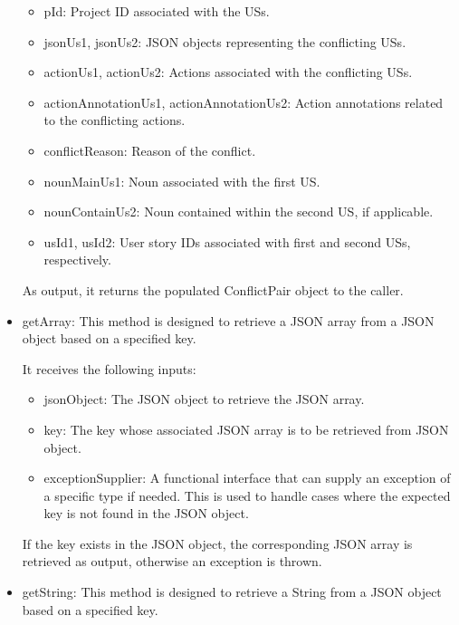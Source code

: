 \begin{itemize}
\begin{itemize}
		\item pId: Project ID associated with the USs.
		
		\item jsonUs1, jsonUs2: JSON objects representing the conflicting USs.
		
		\item actionUs1, actionUs2: Actions associated with the conflicting USs.
		
		\item actionAnnotationUs1, actionAnnotationUs2: Action annotations related to the conflicting actions.
		
		\item conflictReason: Reason of the conflict.
		
		\item nounMainUs1: Noun associated with the first US.
		
		\item nounContainUs2: Noun contained within the second US, if applicable.
		
		\item usId1, usId2: User story IDs associated with first and second USs, respectively.
	\end{itemize}
	As output, it returns the populated ConflictPair object to the caller. 
	
	\item getArray: This method is designed to retrieve a JSON array from a JSON object based on a specified key.
	
	It receives the following inputs:
	\begin{itemize}
		\item jsonObject: The JSON object to retrieve the JSON array.
		
		\item key: The key whose associated JSON array is to be retrieved from JSON object.
		
		\item exceptionSupplier: A functional interface that can supply an exception of a specific type if needed. This is used to handle cases where the expected key is not found in the JSON object.
		
	\end{itemize}
	If the key exists in the JSON object, the corresponding JSON array is retrieved as output, otherwise an exception is thrown.
	
	\item getString: This method is designed to retrieve a String from a JSON object based on a specified key.
	

\end{itemize}

